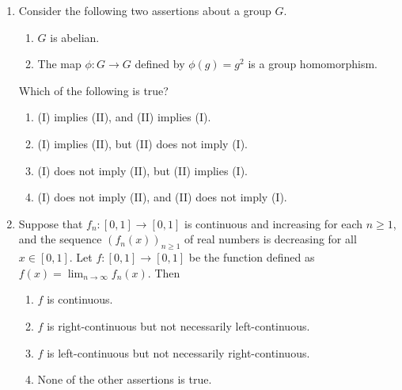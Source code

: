 \documentclass[11pt, a4paper]{article}
\begin{document}
\begin{enumerate}
\item Consider the following two assertions about a group $G$.
\begin{enumerate}[label=(\Roman*)]
\item $G$ is abelian.
\item The map $\phi:G\to G$ defined by $\phi(g)=g^2$ is a group homomorphism.
\end{enumerate}
Which of the following is true?
\begin{enumerate}[label=(\alph*)]
\item (I) implies (II), and (II) implies (I).
\item (I) implies (II), but (II) does not imply (I).
\item (I) does not imply (II), but (II) implies (I).
\item (I) does not imply (II), and (II) does not imply (I).
\end{enumerate}

\item Suppose that $f_n:[0,1]\to[0,1]$ is continuous and increasing for each $n\ge1$, and the sequence $(f_n(x))_{n\ge1}$ of real numbers is decreasing for all $x\in[0,1]$. Let $f:[0,1]\to[0,1]$ be the function defined as $f(x)=\lim_{n\to\infty}f_n(x)$. Then
\begin{enumerate}[label=(\alph*)]
\item $f$ is continuous.
\item $f$ is right-continuous but not necessarily left-continuous.
\item $f$ is left-continuous but not necessarily right-continuous.
\item None of the other assertions is true.
\end{enumerate}
\end{enumerate}
\end{document}
